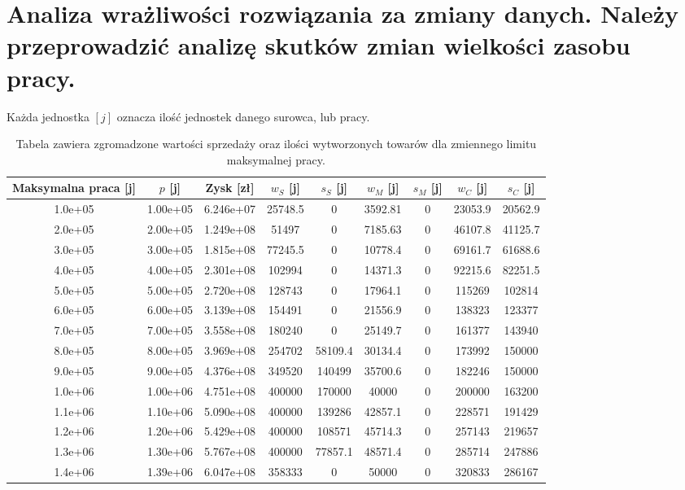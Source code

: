 \documentclass{article}
\begin{document}
\section{Analiza wrażliwości rozwiązania za zmiany danych. Należy przeprowadzić analizę skutków zmian wielkości zasobu pracy.}

Każda jednostka $[j]$ oznacza ilość jednostek danego surowca, lub pracy.

\begin{table}[H]
  \begin{center}
    \begin{tabular}{c c c c c c c c c }
      Maksymalna praca [j]& $p$ [j]& Zysk [zł] & $w_S$ [j]& $s_S$ [j]& $w_M$ [j]& $s_M$ [j]& $w_C$ [j]& $s_C$ [j] \\
      \hline
      1.0e+05  &1.00e+05  &6.246e+07  &25748.5  &0        &3592.81  &0  &23053.9  &20562.9 \\
      2.0e+05  &2.00e+05  &1.249e+08  &51497    &0        &7185.63  &0  &46107.8  &41125.7 \\
      3.0e+05  &3.00e+05  &1.815e+08  &77245.5  &0        &10778.4  &0  &69161.7  &61688.6 \\
      4.0e+05  &4.00e+05  &2.301e+08  &102994   &0        &14371.3  &0  &92215.6  &82251.5 \\
      5.0e+05  &5.00e+05  &2.720e+08  &128743   &0        &17964.1  &0  &115269   &102814 \\
      6.0e+05  &6.00e+05  &3.139e+08  &154491   &0        &21556.9  &0  &138323   &123377 \\
      7.0e+05  &7.00e+05  &3.558e+08  &180240   &0        &25149.7  &0  &161377   &143940 \\
      8.0e+05  &8.00e+05  &3.969e+08  &254702   &58109.4  &30134.4  &0  &173992   &150000 \\
      9.0e+05  &9.00e+05  &4.376e+08  &349520   &140499   &35700.6  &0  &182246   &150000 \\
      1.0e+06  &1.00e+06  &4.751e+08  &400000   &170000   &40000    &0  &200000   &163200 \\
      1.1e+06  &1.10e+06  &5.090e+08  &400000   &139286   &42857.1  &0  &228571   &191429 \\
      1.2e+06  &1.20e+06  &5.429e+08  &400000   &108571   &45714.3  &0  &257143   &219657 \\
      1.3e+06  &1.30e+06  &5.767e+08  &400000   &77857.1  &48571.4  &0  &285714   &247886 \\
      1.4e+06  &1.39e+06  &6.047e+08  &358333   &0        &50000    &0  &320833   &286167
    \end{tabular} 
    \caption{\label{table:allData}Tabela zawiera zgromadzone wartości sprzedaży oraz ilości wytworzonych towarów dla zmiennego limitu maksymalnej pracy.}
  \end{center}
\end{table}
\end{document}
